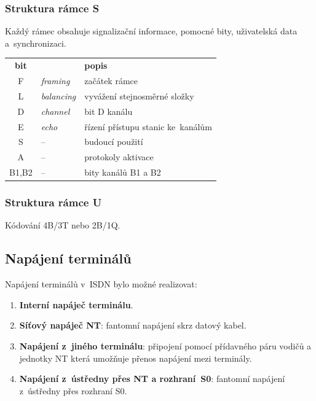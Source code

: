 \subsubsection{Struktura rámce S}

Každý rámec obsahuje signalizační informace, pomocné bity, uživatelská data a~synchronizaci.

\begin{center}
    \begin{tabular}{cll}
        \textbf{bit} &                  & \textbf{popis}                    \\
        F            & \emph{framing}   & začátek rámce                     \\
        L            & \emph{balancing} & vyvážení stejnosměrné složky      \\
        D            & \emph{channel}   & bit D kanálu                      \\
        E            & \emph{echo}      & řízení přístupu stanic ke~kanálům \\
        S            & --               & budoucí použití                   \\
        A            & --               & protokoly aktivace                \\
        B1,B2        & --               & bity kanálů B1 a B2               \\
    \end{tabular}
\end{center}


\subsubsection{Struktura rámce U}

Kódování 4B/3T nebo 2B/1Q.


\subsection{Napájení terminálů}

Napájení terminálů v~ISDN bylo možné realizovat:

\begin{enumerate}
    \item \textbf{Interní napáječ terminálu}.
    \item \textbf{Síťový napáječ NT}: fantomní napájení skrz datový kabel.
    \item \textbf{Napájení z~jiného terminálu}: připojení pomocí přídavného páru vodičů a jednotky NT která umožňuje přenos napájení mezi terminály.
    \item \textbf{Napájení z~ústředny přes NT a rozhraní~S0}: fantomní napájení z~ústředny přes rozhraní S0.
\end{enumerate}



